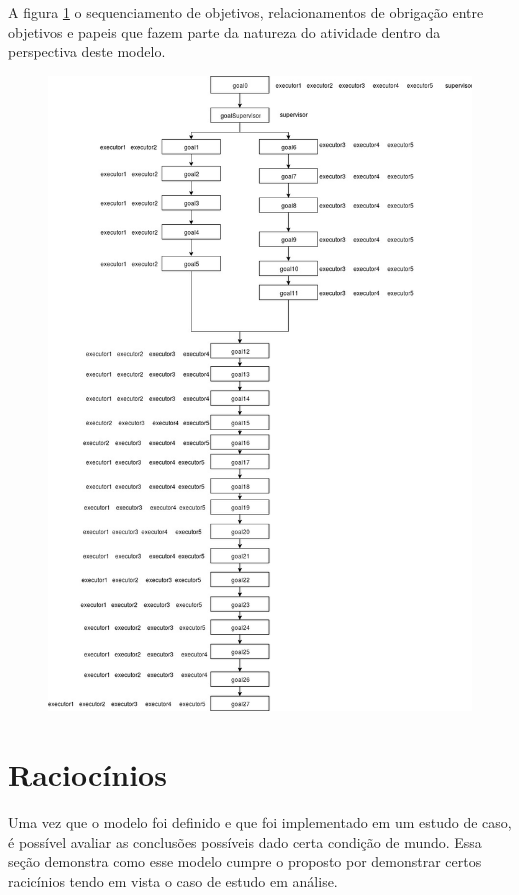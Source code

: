 \documentclass[12pt]{article}
\begin{document}
A figura \ref{statediagram} o sequenciamento de objetivos, relacionamentos de obrigação entre objetivos e papeis que fazem parte da natureza do atividade dentro da perspectiva deste modelo.
\begin{figure}[H]
  \centering
  \includegraphics[width=1\linewidth]{diagramaDeObjetivos.jpg} 
  \caption{}
  \label{statediagram}
\end{figure}

\section{Raciocínios} 

Uma vez que o modelo foi definido e que foi implementado em um estudo de caso, é possível avaliar as conclusões possíveis dado certa condição de mundo. Essa seção demonstra como esse modelo cumpre o proposto por demonstrar certos racicínios tendo em vista o caso de estudo em análise. 
\end{document}
